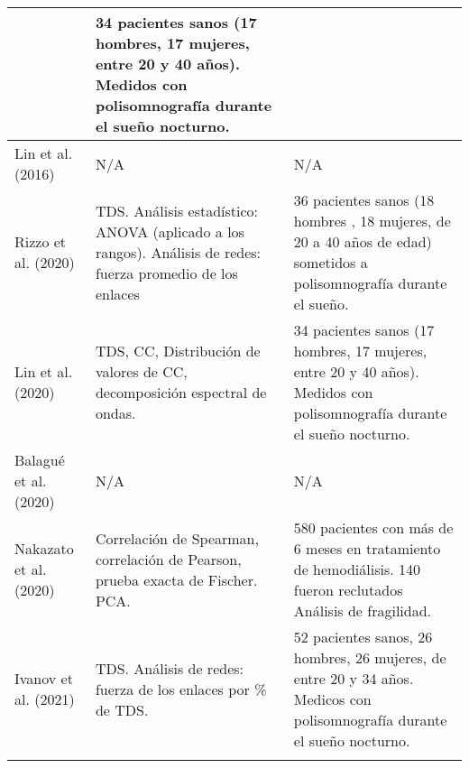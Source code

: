 \documentclass[twoside,twocolumn]{article}
\begin{document}
\begin{center}
\begin{longtable}{|p{}p{}p{}|}
    &
    34 pacientes sanos (17 hombres, 17 mujeres, entre 20 y 40 años). Medidos con polisomnografía durante el sueño nocturno.
    \\ \hline
    Lin et al. (2016)\cite{ivanov2016focus} &
    N/A
    &
    N/A
    \\ \hline
    Rizzo et al. (2020)\cite{rizzo2020network} &
    TDS.
    Análisis estadístico: ANOVA (aplicado a los rangos).
    Análisis de redes: fuerza promedio de los enlaces
    &
    36 pacientes sanos (18 hombres , 18 mujeres, de 20 a 40 años de edad) sometidos a polisomnografía durante el sueño.
    \\ \hline
    Lin et al. (2020)\cite{lin2020dynamic} &
    TDS, CC, Distribución de valores de CC, decomposición espectral de ondas.
    &
    34 pacientes sanos (17 hombres, 17 mujeres, entre 20 y 40 años). Medidos con polisomnografía durante el sueño nocturno.
    \\ \hline
    Balagué et al. (2020)\cite{balague2020network} &
    N/A
    &
    N/A
    \\ \hline
    Nakazato et al. (2020)\cite{nakazato2020estimation} &
    Correlación de Spearman, correlación de Pearson, prueba exacta de Fischer.
    PCA.
    &
    580 pacientes con más de 6 meses en tratamiento de hemodiálisis. 140 fueron reclutados Análisis de fragilidad.
    \\ \hline
    Ivanov et al. (2021)\cite{ivanov2021signal} &
    TDS.
    Análisis de redes: fuerza de los enlaces por \% de TDS.
    &
    52 pacientes sanos, 26 hombres, 26 mujeres, de entre 20 y 34 años. Medicos con polisomnografía durante el sueño nocturno.
    \\ \hline
    \label{tab:plamenGroup}
  \end{longtable}
\end{center}
\end{document}
